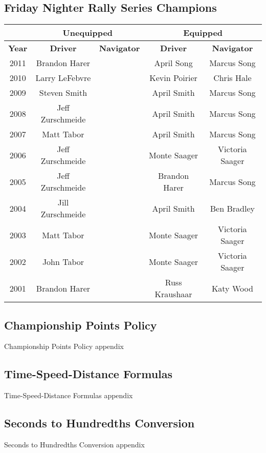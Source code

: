 \subsection{Friday Nighter Rally Series Champions}
\begin{tabular}{|c|c|p{3cm}|c|c|}
\hline
 & \multicolumn{2}{|c|}{Unequipped} & \multicolumn{2}{|c|}{Equipped} \\
\hline
\textbf{Year} & \textbf{Driver} & \textbf{Navigator} & \textbf{Driver} & \textbf{Navigator} \\
\hline
2011 & Brandon Harer & \centering{Markus Gattman} & April Song & Marcus Song \\
\hline
2010 & Larry LeFebvre & \centering{tie: Rick Vonk / Jill Zurschmeide} & Kevin Poirier & Chris Hale \\
\hline
2009 & Steven Smith & \centering{John Masterman} & April Smith & Marcus Song \\
\hline
2008 & Jeff Zurschmeide & \centering{Jill Zurschmeide} & April Smith & Marcus Song \\
\hline
2007 & Matt Tabor & \centering{Marcus Gattman} & April Smith & Marcus Song \\
\hline
2006 & Jeff Zurschmeide & \centering{Jill Zurschmeide} & Monte Saager & Victoria Saager \\
\hline
2005 & Jeff Zurschmeide & \centering{Jill Zurschmeide} & Brandon Harer & Marcus Song \\
\hline
2004 & Jill Zurschmeide & \centering{Jeff Zurschmeide} & April Smith & Ben Bradley \\
\hline
2003 & Matt Tabor & \centering{Marcus Gattman} & Monte Saager & Victoria Saager \\
\hline
2002 & John Tabor & \centering{Darlene Tabor} & Monte Saager & Victoria Saager \\
\hline
2001 & Brandon Harer & \centering{Jennifer McGrew} & Russ Kraushaar & Katy Wood \\
\hline
\end{tabular}

\subsection{Championship Points Policy}

Championship Points Policy appendix

\subsection{Time-Speed-Distance Formulas}

Time-Speed-Distance Formulas appendix

\subsection{Seconds to Hundredths Conversion}

\label{apdx:sec-to-hdth-conversion} Seconds to Hundredths Conversion appendix
